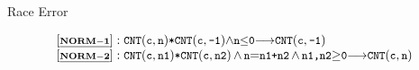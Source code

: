 \begin{frame}[shrink=17]{Race Error}
  
\pause
  \begin{center}
\begin{small}
\[
\begin{array}{l}
\BSPEC{\normrulen{1}:

\CNT{c}{n} {\sep} \CNT{c}{-1} {\wedge} \code{n\sm{\leq}0} {\longrightarrow} \CNT{c}{-1}}
\\
\BSPEC{\normrulen{2}:
\CNT{c}{n1} {\sep} \CNT{c}{n2}\, {\wedge}\, \code{n}{=}\code{n1{+}n2} \,{\wedge}\, \code{n1,n2}{\geq}\code{0} 
{\longrightarrow} \CNT{c}{n}}
\end{array}
\]
\end{small}
\end{center}

\end{frame}

